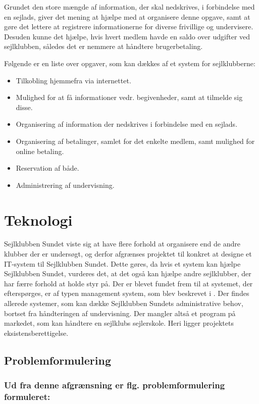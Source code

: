 Grundet den store mængde af information, der skal nedskrives, i forbindelse med en sejlads, giver det mening at hjælpe med at organisere denne opgave, samt at gøre det lettere at registrere informationerne for diverse frivillige og undervisere. 
Desuden kunne det hjælpe, hvis hvert medlem havde en saldo over udgifter ved sejlklubben, således det er nemmere at håndtere brugerbetaling.

Følgende er en liste over opgaver, som kan dækkes af et system for sejlklubberne:

\begin{itemize}
  \item Tilkobling hjemmefra via internettet.
  \item Mulighed for at få informationer vedr. begivenheder, samt at tilmelde sig disse.
  \item Organisering af information der nedskrives i forbindelse med en sejlads.
  \item Organisering af betalinger, samlet for det enkelte medlem, samt mulighed for online betaling.
  \item Reservation af både. 
  \item Administrering af undervisning.
\end{itemize}


\section{Teknologi}

Sejlklubben Sundet viste sig at have flere forhold at organisere end de andre klubber der er undersøgt, og derfor afgrænses projektet til konkret at designe et IT-system til Sejlklubben Sundet. 
Dette gøres, da hvis et system kan hjælpe Sejlklubben Sundet, vurderes det, at det også kan hjælpe andre sejlklubber, der har færre forhold at holde styr på.
Der er blevet fundet frem til at systemet, der efterspørges, er af typen management system, som blev beskrevet i .
Der findes allerede systemer, som kan dække Sejlklubben Sundets administrative behov, bortset fra håndteringen af undervisning.
Der mangler altså et program på markedet, som kan håndtere en sejlklubs sejlerskole.
Heri ligger projektets eksistensberettigelse.

\subsection*{Problemformulering}
\subsubsection*{Ud fra denne afgrænsning er flg. problemformulering formuleret:}


